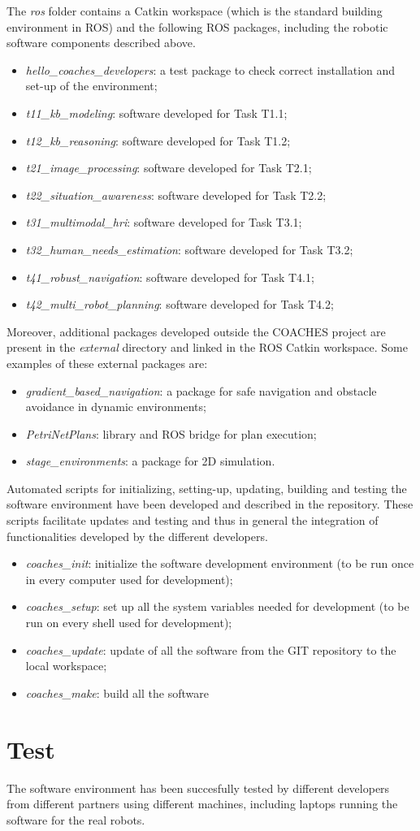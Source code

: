 \documentclass{article}
\begin{document}
The \emph{ros} folder contains a Catkin workspace (which is the standard building environment in ROS) and the following ROS packages, including the robotic software components described above.

\begin{itemize}
\item \emph{hello\_coaches\_developers}: a test package to check correct installation and set-up of the environment;
\item \emph{t11\_kb\_modeling}: software developed for Task T1.1;
\item \emph{t12\_kb\_reasoning}: software developed for Task T1.2;
\item \emph{t21\_image\_processing}: software developed for Task T2.1;
\item \emph{t22\_situation\_awareness}: software developed for Task T2.2;
\item \emph{t31\_multimodal\_hri}: software developed for Task T3.1;
\item \emph{t32\_human\_needs\_estimation}: software developed for Task T3.2;
\item \emph{t41\_robust\_navigation}: software developed for Task T4.1;
\item \emph{t42\_multi\_robot\_planning}: software developed for Task T4.2;
\end{itemize}


Moreover, additional packages developed outside the COACHES project are present in the \emph{external} directory and linked in the ROS Catkin workspace.
Some examples of these external packages are:
\begin{itemize}
\item \emph{gradient\_based\_navigation}: a package for safe navigation and obstacle avoidance in dynamic environments;
\item \emph{PetriNetPlans}: library and ROS bridge for plan execution;
\item \emph{stage\_environments}: a package for 2D simulation.
\end{itemize}

Automated scripts for initializing, setting-up, updating, building and testing the software environment have been developed and described in the repository. These scripts facilitate updates and testing and thus in  general the integration of functionalities developed by the different developers.

\begin{itemize}
\item \emph{coaches\_init}: initialize the software development environment (to be run once in every computer used for development);
\item \emph{coaches\_setup}:   set up all the system variables needed for development (to be run on every shell used for development);
\item \emph{coaches\_update}:  update of all the software from the GIT repository to the local workspace;
\item \emph{coaches\_make}:   build all the software
\end{itemize}

\section{Test}

The software environment has been succesfully tested by different developers from different partners using different machines, including laptops running the software for the real robots.
\end{document}
